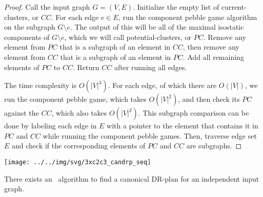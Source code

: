 \begin{proof}
    Call the input graph $G=(V,E)$. Initialize the empty list of current-clusters, or $CC$. For each edge $e\in E$, run the component pebble game algorithm \cite{Jacobs:1997:PG} on the subgraph $G\setminus e$. The output of this will be all of the maximal isostatic components of $G\setminus e$, which we will call potential-clusters, or $PC$. Remove any element from $PC$ that is a subgraph of an element in $CC$, then remove any element from $CC$ that is a subgraph of an element in $PC$. Add all remaining elements of $PC$ to $CC$. Return $CC$ after running all edges.

    The time complexity is $O(|V|^3)$. For each edge, of which there are $O(|V|)$, we run the component pebble game, which takes $O(|V|^2)$, and then check its $PC$ against the $CC$, which also takes $O(|V|^2)$. This subgraph comparison can be done by labeling each edge in $E$ with a pointer to the element that contains it in $PC$ and $CC$ while running the component pebble games. Then, traverse edge set $E$ and check if the corresponding elements of $PC$ and $CC$ are subgraphs.
\end{proof}

\begin{figure*}\centering%
  \texttt{[image: ../../img/svg/3xc2c3\_candrp\_seq]}
  \caption{The sequential canonical DR-plan of $G_{demo}$ from Figure~\ref{fig:demo_graph:graph}, which is optimal (as explained in the proof of Theorem~\ref{theorem:algo_complexity}). The children of the triangle are omitted. Compare to to the typical canonical DR-plan shown in Figure~\ref{fig:demo_graph:candrp}. Also, note that the bottom-left node, the triangle, is the intersection of the 3 children of $G_{demo}$ in $ComDRP(G_{demo})$, shown in Figure~\ref{fig:demo_graph:comdrp}.}
  \label{fig:demo_graph:candrpseq}
\end{figure*}%

\begin{theorem}
\label{theorem:algo_complexity}
    There exists an \ComplexityCanDRPV\ algorithm to find a canonical DR-plan for an independent input graph.
\end{theorem}

